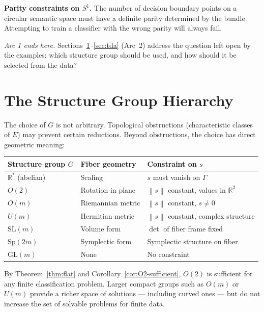 \documentclass[11pt, a4paper]{article}
\theoremstyle{plain}
\theoremstyle{definition}
\newcommand{\R}{\mathbb{R}}
\newcommand{\GL}{\mathrm{GL}}
\newcommand{\Gam}{\Gamma}
\newcommand{\norm}[1]{\left\|#1\right\|}
\begin{document}
\textbf{Parity constraints on $S^1$.} The number of decision boundary points on
a circular semantic space must have a definite parity determined by the bundle.
Attempting to train a classifier with the wrong parity will always fail.

\medskip
\noindent\textit{Arc 1 ends here.} Sections~\ref{sec:hierarchy}--\ref{sec:tda}
(Arc~2) address the question left open by the examples: which structure group
should be used, and how should it be selected from the data?

\section{The Structure Group Hierarchy}\label{sec:hierarchy}

The choice of $G$ is not arbitrary. Topological obstructions (characteristic
classes of $E$) may prevent certain reductions. Beyond obstructions, the choice
has direct geometric meaning:

\begin{center}
\renewcommand{\arraystretch}{1.3}
\begin{tabular}{@{}lll@{}}
\toprule
\textbf{Structure group $G$} & \textbf{Fiber geometry} & \textbf{Constraint on $s$} \\
\midrule
$\R^*$ (abelian)  & Scaling            & $s$ must vanish on $\Gam$ \\
$O(2)$            & Rotation in plane  & $\norm{s}$ constant, values in $\R^2$ \\
$O(m)$            & Riemannian metric  & $\norm{s}$ constant, $s\neq 0$ \\
$U(m)$            & Hermitian metric   & $\norm{s}$ constant, complex structure \\
$\mathrm{SL}(m)$  & Volume form        & $\det$ of fiber frame fixed \\
$\mathrm{Sp}(2m)$ & Symplectic form    & Symplectic structure on fiber \\
$\GL(m)$          & None               & No constraint \\
\bottomrule
\end{tabular}
\end{center}

\medskip
By Theorem~\ref{thm:flat} and Corollary~\ref{cor:O2-sufficient}, $O(2)$ is
sufficient for any finite classification problem. Larger compact groups such as
$O(m)$ or $U(m)$ provide a richer space of solutions --- including curved ones ---
but do not increase the set of solvable problems for finite data.
\end{document}
